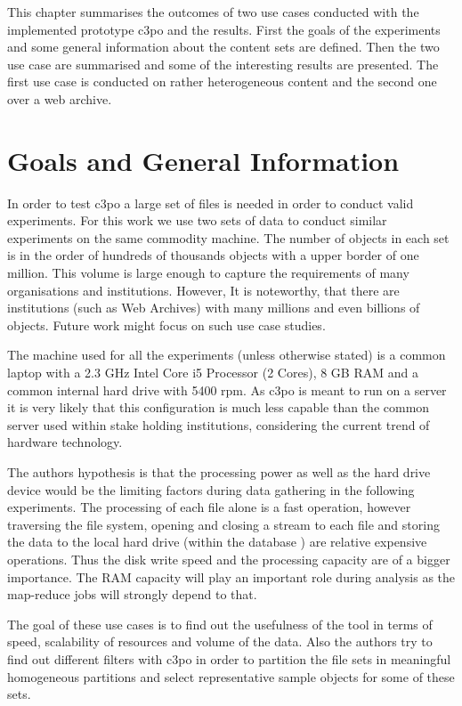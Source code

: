 This chapter summarises the outcomes of two use cases conducted with the implemented prototype c3po and
the results. First the goals of the experiments and some general information about the content sets are defined. Then the two use case are summarised and some of the interesting results are presented. The first use case is conducted on rather heterogeneous content and the second one over a web archive.

\section{Goals and General Information}
In order to test c3po a large set of files is needed in order to conduct valid experiments.
For this work we use two sets of data to conduct similar experiments on the same commodity machine. The number of objects in each set is in the order of hundreds of thousands objects with a upper border of one million. This volume is large enough to capture the requirements of many organisations and institutions. However, It is noteworthy, that there are institutions (such as Web Archives) with many millions and even billions of objects. Future work might focus on such use case studies.

The machine used for all the experiments (unless otherwise stated) is a common laptop with a 2.3 GHz Intel Core i5 Processor (2 Cores), 8 GB RAM and a common internal hard drive with 5400 rpm. As c3po is meant to run on a server it is very likely that this configuration is much less capable than the common server used within stake holding institutions, considering the current trend of hardware technology.

The authors hypothesis is that the processing power as well as the hard drive device would be the limiting factors during data gathering in the following experiments. The  processing of each file alone is a fast operation, however traversing the file system, opening and closing a stream to each file and storing the data to the local hard drive (within the database ) are relative expensive operations. Thus the disk write speed and the processing capacity are of a bigger importance. The RAM capacity will play an important role during analysis as the map-reduce jobs will strongly depend to that.

The goal of these use cases is to find out the usefulness of the tool in terms of speed, scalability of resources and volume of the data. Also the authors try to find out different filters with c3po in order to partition the file sets in meaningful homogeneous partitions and select representative sample objects for some of these sets.

